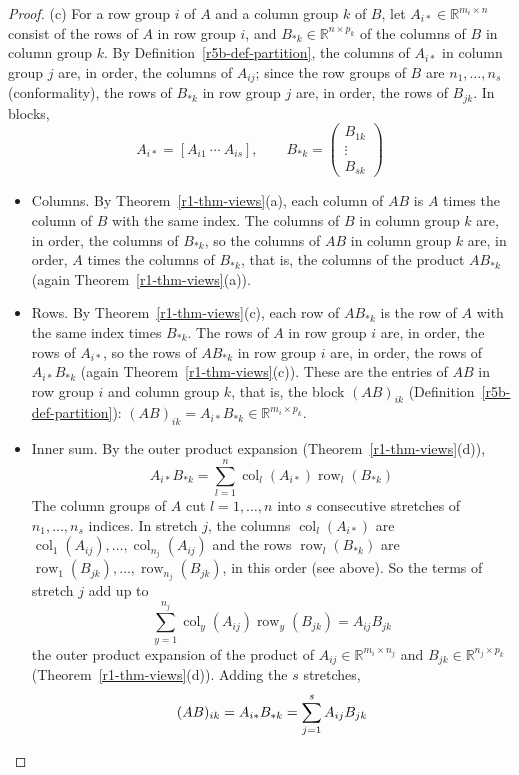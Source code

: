 \documentclass[12pt]{article}
\newcommand{\R}{\mathbb R}
\DeclareMathOperator{\row}{row}
\DeclareMathOperator{\col}{col}
\theoremstyle{definition}
\begin{document}
\begin{proof}
(c) For a row group \(i\) of \(A\) and a column group \(k\) of \(B\), let \(A_{i\ast}\in\R^{m_i\times n}\) consist of
the rows of \(A\) in row group \(i\), and \(B_{\ast k}\in\R^{n\times p_k}\) of the columns of \(B\) in column group
\(k\). By Definition~\ref{r5b-def-partition}, the columns of \(A_{i\ast}\) in column group \(j\) are, in order, the
columns of \(A_{ij}\); since the row groups of \(B\) are \(n_1,\dots,n_s\) (conformality), the rows of \(B_{\ast k}\)
in row group \(j\) are, in order, the rows of \(B_{jk}\). In blocks,
\[
A_{i\ast}=[A_{i1}\ \cdots\ A_{is}],\qquad
B_{\ast k}=\begin{pmatrix}B_{1k}\\\vdots\\B_{sk}\end{pmatrix}
\]
\begin{itemize}
\item Columns. By Theorem~\ref{r1-thm-views}(a), each column of \(AB\) is \(A\) times the column of \(B\) with the
same index. The columns of \(B\) in column group \(k\) are, in order, the columns of \(B_{\ast k}\), so the columns of
\(AB\) in column group \(k\) are, in order, \(A\) times the columns of \(B_{\ast k}\), that is, the columns of the
product \(AB_{\ast k}\) (again Theorem~\ref{r1-thm-views}(a)).
\item Rows. By Theorem~\ref{r1-thm-views}(c), each row of \(AB_{\ast k}\) is the row of \(A\) with the same index
times \(B_{\ast k}\). The rows of \(A\) in row group \(i\) are, in order, the rows of \(A_{i\ast}\), so the rows of
\(AB_{\ast k}\) in row group \(i\) are, in order, the rows of \(A_{i\ast}B_{\ast k}\) (again
Theorem~\ref{r1-thm-views}(c)). These are the entries of \(AB\) in row group \(i\) and column group \(k\), that is,
the block \((AB)_{ik}\) (Definition~\ref{r5b-def-partition}): \((AB)_{ik}=A_{i\ast}B_{\ast k}\in\R^{m_i\times p_k}\).
\item Inner sum. By the outer product expansion (Theorem~\ref{r1-thm-views}(d)),
\[
A_{i\ast}B_{\ast k}=\sum_{l=1}^n\col_l(A_{i\ast})\row_l(B_{\ast k})
\]
The column groups of \(A\) cut \(l=1,\dots,n\) into \(s\) consecutive stretches of \(n_1,\dots,n_s\) indices. In
stretch \(j\), the columns \(\col_l(A_{i\ast})\) are \(\col_1(A_{ij}),\dots,\col_{n_j}(A_{ij})\) and the rows
\(\row_l(B_{\ast k})\) are \(\row_1(B_{jk}),\dots,\row_{n_j}(B_{jk})\), in this order (see above). So the terms of
stretch \(j\) add up to
\[
\sum_{y=1}^{n_j}\col_y(A_{ij})\row_y(B_{jk})=A_{ij}B_{jk}
\]
the outer product expansion of the product of \(A_{ij}\in\R^{m_i\times n_j}\) and \(B_{jk}\in\R^{n_j\times p_k}\)
(Theorem~\ref{r1-thm-views}(d)). Adding the \(s\) stretches,
\[
(AB)_{ik}=A_{i\ast}B_{\ast k}=\sum_{j=1}^sA_{ij}B_{jk}\qedhere
\]
\end{itemize}
\end{proof}
\end{document}
